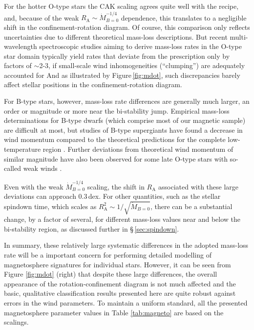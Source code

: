 \documentclass[useAMS,usenatbib]{mn2e}
\newcommand{\ra}{R_\mathrm{A}}
\newcommand{\mdot}{\dot{M}_{B=0}}
\begin{document}
For the hotter O-type stars the CAK scaling agrees quite well with the \citeauthor{2001A&A...369..574V} recipe, and, because of the weak $\ra \sim \mdot^{-1/4}$ dependence, this translates to a negligible shift in the confinement-rotation diagram. 
Of course, this comparison only reflects uncertainties due to different theoretical mass-loss descriptions. But recent multi-wavelength spectroscopic studies aiming to derive mass-loss rates in the O-type star domain typically yield rates that deviate from the \citeauthor{2001A&A...369..574V} prescription only by factors of $\sim$2-3, if small-scale wind inhomogeneities (``clumping'') are adequately accounted for \citep{2011A&A...528A..64S,2011A&A...535A..32N,2012arXiv1205.3075B} 
And as illustrated by Figure\,\ref{fig:mdot}, such discrepancies barely affect stellar positions in the confinement-rotation diagram.

For B-type stars, however, mass-loss rate differences are generally much larger, an order or magnitude or more near the bi-stability jump. Empirical mass-loss determinations for B-type dwarfs (which comprise most of our magnetic sample) are difficult at most, but studies of B-type supergiants have found a decrease in wind momentum compared to the theoretical \citeauthor{2001A&A...369..574V} predictions for the complete low-temperature region \citep{2008A&A...478..823M}. 
Further deviations from theoretical wind momentum of similar magnitude have also been observed for some late O-type stars with so-called weak winds \citep[for an overview see][]{2008A&ARv..16..209P}. 

Even with the weak $\mdot^{-1/4}$ scaling, the shift in $\ra$ associated with these large deviations can approach 0.3\,dex. 
For other quantities, such as the stellar spindown time, which scales as $\ra^2 \sim 1/\sqrt{\mdot}$, there can be a substantial change, by a factor of several,  for different mass-loss values near and below the bi-stability region, as discussed further in \S\,\ref{sec:spindown}.

In summary, these relatively large systematic differences in the adopted mass-loss rate will be a important concern for performing detailed modelling of magnetosphere signatures for individual stars.
However, it can be seen from Figure \ref{fig:mdot} (right) that despite these large differences, the overall appearance of the rotation-confinement diagram is not much affected and the basic, qualitative classification results presented here are quite robust against errors in the wind parameters.
To maintain a uniform standard, all the presented magnetosphere parameter values in Table \ref{tab:magneto} are based on the  \citeauthor{2001A&A...369..574V} scalings.
\end{document}
